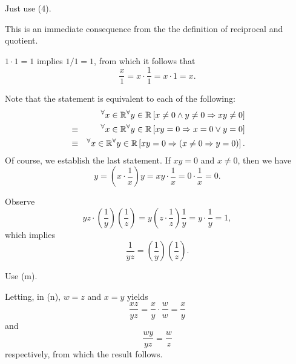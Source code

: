 \documentclass[a4paper,12pt]{article}
\begin{document}
\begin{sol}
	Just use (4).
	
	This is an immediate consequence from the the definition of reciprocal and quotient.
	
	\( 1\cdot 1=1 \)
	implies
	\( 1/1 =1 \),
	from which it follows that
	\begin{equation*}
		\frac{x}{1}
		=
		x\cdot \frac{1}{1}
		=
		x \cdot 1
		=
		x.
	\end{equation*}
	
	\fbox{(\(\ell\))}
	Note that the statement is equivalent to each of the following:
	\begin{eqnarray*}
		&&
		{}^{\forall}  x \in \mathbb{R}
		{}^{\forall}  y \in \mathbb{R}
		\left[
			x\neq 0
			\wedge
			y \neq	0
			\Rightarrow
			xy \neq 0
			\right]\\
		&\equiv&
		{}^{\forall}  x \in \mathbb{R}
		{}^{\forall}  y \in \mathbb{R}
		\left[
			xy = 0
			\Rightarrow
			x= 0
			\vee
			y = 0
			\right]\\
		&\equiv&
		{}^{\forall}  x \in \mathbb{R}
		{}^{\forall}  y \in \mathbb{R}
		\left[
			xy = 0
			\Rightarrow
			\left(
			x \neq 0
			\Rightarrow
			y=0
			\right)
			\right].
	\end{eqnarray*}
	Of course, we establish the last statement.
	If
	\( xy=0 \)
	and
	\( x\neq 0 \),
	then we have
	\begin{equation*}
		y
		=
		\left( x\cdot \frac{1}{x} \right)y
		=
		xy \cdot \frac{1}{x}
		=0 \cdot \frac{1}{x}
		=0.
	\end{equation*}
	
	Observe
	\begin{equation*}
		yz \cdot \left( \frac{1}{y} \right) \left( \frac{1}{z} \right)
		=
		y
		\left( z \cdot \frac{1}{z} \right) \frac{1}{y}
		=
		y \cdot \frac{1}{y}
		=
		1,
	\end{equation*}
	which implies
	\begin{equation*}
		\frac{1}{yz}
		=
		\left( \frac{1}{y} \right) \left( \frac{1}{z} \right).
	\end{equation*}
	
	Use (m).
	
	Letting, in (n),
	\( w=z \)
	and
	\( x=y \)
	yields
	\begin{equation*}
		\frac{xz}{yz}
		=
		\frac{x}{y}\cdot \frac{w}{w}
		=
		\frac{x}{y}
	\end{equation*}
	and
	\begin{equation*}
		\frac{wy}{yz}
		=
		\frac{w}{z}
	\end{equation*}
	respectively,
	from which the result follows.
	

\end{sol}
\end{document}
